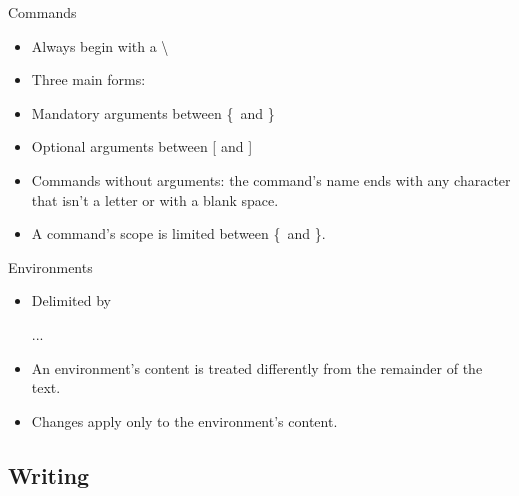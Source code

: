 \begin{frame}[fragile]{Commands}
	\begin{itemize}
		\item Always begin with a \textbackslash
		\item Three main forms:
\begin{codesource}
	\commandname
\end{codesource}
		\item Mandatory arguments between \{\ and \}
		\item Optional arguments between [ and ]
		\item Commands without arguments: the command's name ends with any character that isn't a letter or with a blank space.
		\item A command's scope is limited between \{\ and \}.
	\end{itemize}
\end{frame}

\begin{frame}[fragile,c]{Environments}
	\begin{itemize}
		\item Delimited by
\begin{codesource}
	\begin{environment}
		...
	\end{environment}
\end{codesource}
		\item An environment's content is treated differently from the remainder of the text.
		\item Changes apply only to the environment's content.
	\end{itemize}
\end{frame}

\subsection{Writing}

